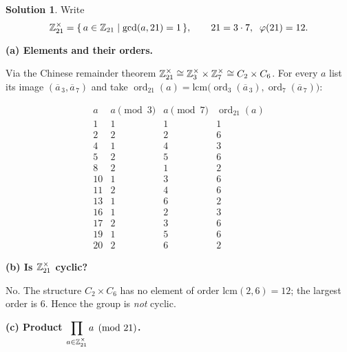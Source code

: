 \documentclass[12pt]{article}
\theoremstyle{definition} %
\newtheorem{solution}{Solution}
\theoremstyle{plain} %
\begin{document}
    \begin{solution}
      Write  
      \[
         \Bbb Z_{21}^{\times}
         =\{\,a\in\Bbb Z_{21}\mid\gcd(a,21)=1\,\},
         \qquad
         21=3\cdot7,\;\; \varphi(21)=12 .
      \]
      
      \bigskip
      \textbf{(a)  Elements and their orders.}
      
      Via the Chinese remainder theorem  
      \(\Bbb Z_{21}^{\times}\cong\Bbb Z_{3}^{\times}\times\Bbb Z_{7}^{\times}
              \cong C_{2}\times C_{6}\).
      For every \(a\) list its image \((\overline a_{\,3},\overline a_{\,7})\)
      and take
      \(\operatorname{ord}_{21}(a)=\mathrm{lcm}
            \bigl(\operatorname{ord}_{3}(\overline a_{\,3}),
                  \operatorname{ord}_{7}(\overline a_{\,7})\bigr)\):
      
      \[
      \renewcommand{\arraystretch}{1.25}
      \begin{array}{c|c|c|c}
      a & a\pmod3 & a\pmod7 & \operatorname{ord}_{21}(a)\\\hline
       1 & 1 & 1 & 1\\
       2 & 2 & 2 & 6\\
       4 & 1 & 4 & 3\\
       5 & 2 & 5 & 6\\
       8 & 2 & 1 & 2\\
      10 & 1 & 3 & 6\\
      11 & 2 & 4 & 6\\
      13 & 1 & 6 & 2\\
      16 & 1 & 2 & 3\\
      17 & 2 & 3 & 6\\
      19 & 1 & 5 & 6\\
      20 & 2 & 6 & 2
      \end{array}
      \]
      
      \bigskip
      \textbf{(b)  Is \(\Bbb Z_{21}^{\times}\) cyclic?}
      
      No.  
      The structure \(C_{2}\times C_{6}\) has no element of order
      \(\mathrm{lcm}(2,6)=12\); the largest order is \(6\).  
      Hence the group is \emph{not} cyclic.
      
      \bigskip
      \textbf{(c)  Product \(\displaystyle\prod_{a\in\Bbb Z_{21}^{\times}} a
                  \pmod{21}\).}
      

\end{solution}
\end{document}
